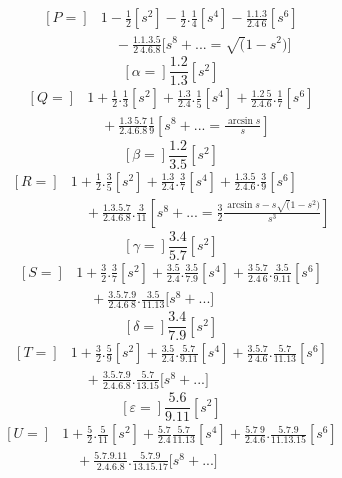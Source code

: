 \begingroup
\clearpage{}
\noindent{\small[S. 59]}\par
\[\begin{aligned}
{}[P=]&1-\frac12[s^2]-\frac12{.}\frac14[s^4]-\frac{1{.}1{.}3}{2{.}4\ 6}[s^6]\\[.6em]
&\quad-\frac{1{.}1{.}3{.}5}{2\ 4{.}6{.}8}\bigl[s^8+{.}{.}{.}=\surd(1-s^2)\bigr]
\end{aligned}\]
\[{}[\alpha=]\frac{1{.}2}{1{.}3}[s^2]\]
\[\begin{aligned}
{}[Q=]&1+\frac12{.}\frac13[s^2]+\frac{1{.}3}{2{.}4}{.}\frac15[s^4]+\frac{1{.}2\ 5}{2{.}4{.}6}{.}\frac17[s^6]\\[.6em]
&\quad+\frac{1{.}3\ 5{.}7}{2{.}4{.}6{.}8}\frac19\left[s^8+{.}{.}{.}=\frac{\arcsin s}{s}\right]
\end{aligned}\]
\[{}[\beta=]\frac{1{.}2}{3{.}5}[s^2]\]
\[\begin{aligned}
{}[R=]&1+\frac12{.}\frac35[s^2]+\frac{1{.}3}{2{.}4}{.}\frac37[s^4]+\frac{1{.}3{.}5}{2{.}4{.}6}{.}\frac39[s^6]\\[.6em]
&\quad+\frac{1{.}3{.}5{.}7}{2{.}4{.}6{.}8}{.}\frac3{11}\left[s^8+{.}{.}{.}=\frac32\frac{\arcsin s-s\surd(1-s^2)}{s^3}\right]
\end{aligned}\]
\[{}[\gamma=]\frac{3{.}4}{5{.}7}[s^2]\]
\[\begin{aligned}
{}[S=]&1+\frac32{.}\frac37[s^2]+\frac{3{.}5}{2{.}4}{.}\frac{3{.}5}{7{.}9}[s^4]+\frac{3\ 5{.}7}{2{.}4\ 6}{.}\frac{3{.}5}{9{.}11}[s^6]\\[.6em]
&\quad+\frac{3{.}5{.}7{.}9}{2{.}4{.}6\ 8}{.}\frac{3{.}5}{11{.}13}\bigl[s^8+{.}{.}{.}\bigr]
\end{aligned}\]
\[{}[\delta=]\frac{3{.}4}{7{.}9}[s^2]\]
\clearpage{}
\[\begin{aligned}
{}[T=]&1+\frac32{.}\frac59[s^2]+\frac{3{.}5}{2{.}4}{.}\frac{5{.}7}{9{.}11}[s^4]+\frac{3{.}5{.}7}{2\ 4{.}6}{.}\frac{5{.}7}{11{.}13}[s^6]\\[.6em]
&\quad+\frac{3{.}5{.}7{.}9}{2{.}4{.}6{.}8}{.}\frac{5{.}7}{13{.}15}\bigl[s^8+{.}{.}{.}\bigr]
\end{aligned}\]
\[{}[\varepsilon=]\frac{5{.}6}{9{.}11}[s^2]\]
\[\begin{aligned}
{}[U=]&1+\frac52{.}\frac5{11}[s^2]+\frac{5{.}7}{2{.}4}\frac{5{.}7}{11{.}13}[s^4]+\frac{5{.}7\ 9}{2{.}4{.}6}{.}\frac{5{.}7{.}9}{11{.}13{.}15}[s^6]\\[.6em]
&\quad+\frac{5{.}7{.}9{.}11}{2{.}4{.}6{.}8}{.}\frac{5{.}7{.}9}{13{.}15{.}17}\bigl[s^8+{.}{.}{.}\bigr]
\end{aligned}\]
